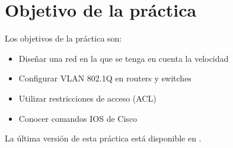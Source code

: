 
\usepackage{eurosym}


\renewcommand{\hmwkClass}{Planificación y Administración de Redes}
\renewcommand{\hmwkTitle}{Práctica VLAN y ACL en Cisco}









\primerapagina

\setlength{\parindent}{0em}
\setlength{\parskip}{1em}


\section{Objetivo de la práctica}
Los objetivos de la práctica son:
\begin{itemize}
\item Diseñar una red en la que se tenga en cuenta la velocidad
\item Configurar VLAN 802.1Q en routers y switches
\item Utilizar restricciones de acceso (ACL)
\item Conocer comandos IOS de Cisco
\end{itemize}


La última versión de esta práctica está disponible en .


